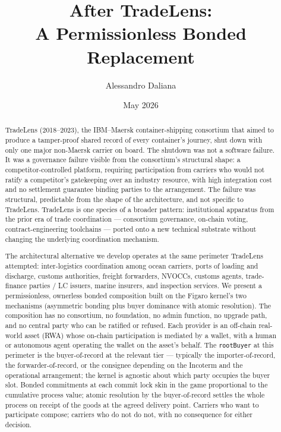 \documentclass[11pt,a4paper]{article}
\title{%
  After TradeLens:\\
  A Permissionless Bonded Replacement%
}
\author{
  Alessandro Daliana
}
\date{May 2026}
\theoremstyle{definition}
\theoremstyle{remark}
\begin{document}
\maketitle

\begin{abstract}
TradeLens (2018--2023), the IBM--Maersk container-shipping consortium
that aimed to produce a tamper-proof shared record of every container's
journey, shut down with only one major non-Maersk carrier on board. The
shutdown was not a software failure. It was a governance failure
visible from the consortium's structural shape: a competitor-controlled
platform, requiring participation from carriers who would not ratify a
competitor's gatekeeping over an industry resource, with high
integration cost and no settlement guarantee binding parties to the
arrangement. The failure was structural, predictable from the shape of
the architecture, and not specific to TradeLens. TradeLens is
one species of a broader pattern: institutional apparatus from
the prior era of trade coordination --- consortium governance,
on-chain voting, contract-engineering toolchains --- ported onto
a new technical substrate without changing the underlying
coordination mechanism.

The architectural alternative we develop operates at the same
perimeter TradeLens attempted: inter-logistics coordination among
ocean carriers, ports of loading and discharge, customs authorities,
freight forwarders, NVOCCs, customs agents, trade-finance parties /
LC issuers, marine insurers, and inspection services. We present a
permissionless, ownerless bonded composition built on the Figaro
kernel's two mechanisms (asymmetric bonding plus buyer dominance with
atomic resolution). The composition has no consortium, no foundation,
no admin function, no upgrade path, and no central party who can be
ratified or refused. Each provider is an off-chain real-world asset
(RWA) whose on-chain participation is mediated by a wallet, with a
human or autonomous agent operating the wallet on the asset's behalf.
The \texttt{rootBuyer} at this perimeter is the buyer-of-record at the
relevant tier --- typically the importer-of-record, the
forwarder-of-record, or the consignee depending on the Incoterm and
the operational arrangement; the kernel is agnostic about which
party occupies the buyer slot. Bonded commitments at each commit lock
skin in the game proportional to the cumulative process value; atomic
resolution by the buyer-of-record settles the whole process on receipt
of the goods at the agreed delivery point. Carriers who want to
participate compose; carriers who do not do not, with no consequence
for either decision.


\end{abstract}
\end{document}
